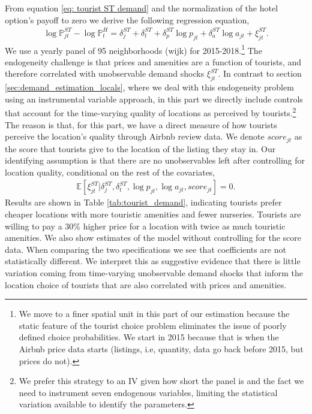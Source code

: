 \documentclass[11pt]{article}
\newcommand{\E}{\mathbb{E}}
\newcommand{\Prob}{\mathbb{P}}
\begin{document}
From equation \eqref{eq: tourist ST demand} and the normalization of the hotel option's payoff to zero we derive the following regression equation,
\begin{align*}
    \log \Prob^{ST}_{jt} - \log \Prob^{H}_t = \delta_{j}^{ST} + \delta^{ST}_t  + \delta_{p}^{ST} \log p_{{j}t} + \delta_{a}^{ST} \log a_{jt} + \xi_{{j}t}^{ST}.
\end{align*}
We use a yearly panel of 95 neighborhoods (wijk) for 2015-2018.\footnote{We move to a finer spatial unit in this part of our estimation because the static feature of the tourist choice problem eliminates the issue of poorly defined choice probabilities. We start in 2015 because that is when the Airbnb price data starts (listings, i.e, quantity, data go back before 2015, but prices do not).} The endogeneity challenge is that prices and amenities are a function of tourists, and therefore correlated with unobservable demand shocks $\xi_{{j}t}^{ST}$. In contrast to section \ref{sec:demand_estimation_locals}, where we deal with this endogeneity problem using an instrumental variable approach, in this part we directly include controls that account for the time-varying quality of locations as perceived by tourists.\footnote{We prefer this strategy to an IV given how short the panel is and the fact we need to instrument seven endogenous variables, limiting the statistical variation available to identify the parameters.} The reason is that, for this part, we have a direct measure of how tourists perceive the location's quality through Airbnb review data. We denote $score_{jt}$ as the score that tourists give to the location of the listing they stay in. Our identifying assumption is that there are no unobservables left after controlling for location quality, conditional on the rest of the covariates,
\begin{align*}
    \E[\xi_{{j}t}^{ST}|\delta_{j}^{ST} ,\delta^{ST}_t ,\log p_{{j}t},\log a_{jt}, score_{jt}] = 0.
\end{align*}
Results are shown in Table \ref{tab:tourist_demand}, indicating tourists prefer cheaper locations with more touristic amenities and fewer nurseries. Tourists are willing to pay a 30\% higher price for a location with twice as much touristic amenities. We also show estimates of the model without controlling for the score data. When comparing the two specifications we see that coefficients are not statistically different. We interpret this as suggestive evidence that there is little variation coming from time-varying unobservable demand shocks that inform the location choice of tourists that are also correlated with prices and amenities. 
\end{document}
